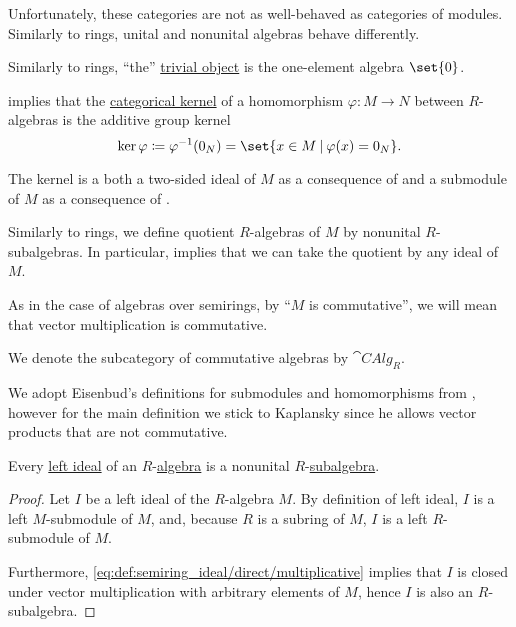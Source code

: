 \begin{definition}
\begin{thmenum}
    Unfortunately, these categories are not as well-behaved as categories of modules. Similarly to rings, unital and nonunital algebras behave differently.

    \mimprovised Similarly to rings, \enquote{the} \hyperref[def:trivial_object]{trivial object} is the one-element algebra \( \set{ 0 } \).

    \mimprovised {} implies that the \hyperref[def:zero_morphisms/kernel]{categorical kernel} of a homomorphism \( \varphi: M \to N \) between  \( R \)-algebras is the additive group kernel
    \begin{equation*}
      \ker \varphi \coloneqq \varphi^{-1}(0_N) = \set{ x \in M \given \varphi(x) = 0_N }.
    \end{equation*}

    The kernel is a both a two-sided ideal of \( M \) as a consequence of  and a submodule of \( M \) as a consequence of .

    \mimprovised Similarly to rings, we define quotient \( R \)-algebras of \( M \) by nonunital \( R \)-subalgebras. In particular,  implies that we can take the quotient by any ideal of \( M \).

    \mimprovised As in the case of algebras over semirings, by \enquote{\( M \) is commutative}, we will mean that vector multiplication is commutative.

    We denote the subcategory of commutative algebras by \( \cat{CAlg}_R \).
  \end{thmenum}
\end{definition}
\begin{comments}
  \item We adopt Eisenbud's definitions for submodules and homomorphisms from \cite[28]{Eisenbud1995CommutativeAlgebra}, however for the main definition we stick to Kaplansky since he allows vector products that are not commutative.
\end{comments}

\begin{proposition}\label{thm:algebra_ideal_is_subalgebra}
  Every \hyperref[def:semiring_ideal]{left ideal} of an \( R \)-\hyperref[def:algebra_over_ring]{algebra} is a nonunital \( R \)-\hyperref[def:algebra_over_ring/submodel]{subalgebra}.
\end{proposition}
\begin{proof}
  Let \( I \) be a left ideal of the \( R \)-algebra \( M \). By definition of left ideal, \( I \) is a left \( M \)-submodule of \( M \), and, because \( R \) is a subring of \( M \), \( I \) is a left \( R \)-submodule of \( M \).

  Furthermore, \eqref{eq:def:semiring_ideal/direct/multiplicative} implies that \( I \) is closed under vector multiplication with arbitrary elements of \( M \), hence \( I \) is also an \( R \)-subalgebra.
\end{proof}

